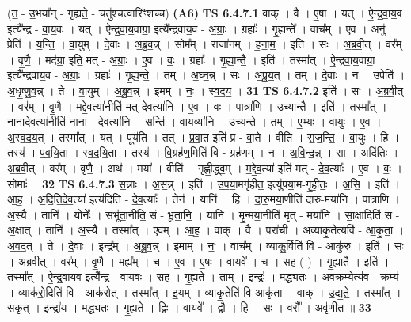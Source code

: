 \documentclass[17pt]{extarticle}
\begin{document}
                  \newline
                      (त॒ - उ॒भया᳚न् - गृह्यते॒ - चतु॑श्चत्वारिꣳशच्च)  \textbf{(A6)} \newline \newline
                                \textbf{ TS 6.4.7.1} \newline
                  वाक् । वै । ए॒षा । यत् । ऐ॒न्द्र॒वा॒य॒व इत्यै᳚न्द्र - वा॒य॒वः । यत् । ऐ॒न्द्र॒वा॒य॒वाग्रा॒ इत्यै᳚न्द्रवाय॒व - अ॒ग्राः॒ । ग्रहाः᳚ । गृ॒ह्यन्ते᳚ । वाच᳚म् । ए॒व । अनु॑ । प्रेति॑ । य॒न्ति॒ । वा॒युम् । दे॒वाः । अ॒ब्रु॒व॒न्न् । सोम᳚म् । राजा॑नम् । ह॒ना॒म॒ । इति॑ । सः । अ॒ब्र॒वी॒त् । वर᳚म् । वृ॒णै॒ । मद॑ग्रा॒ इति॒ मत् - अ॒ग्राः॒ । ए॒व । वः॒ । ग्रहाः᳚ । गृ॒ह्या॒न्तै॒ । इति॑ । तस्मा᳚त् । ऐ॒न्द्र॒वा॒य॒वाग्रा॒ इत्यै᳚न्द्रवाय॒व - अ॒ग्राः॒ । ग्रहाः᳚ । गृ॒ह्य॒न्ते॒ । तम् । अ॒घ्न॒न्न् । सः । अ॒पू॒य॒त् । तम् । दे॒वाः । न । उपेति॑ । अ॒धृ॒ष्णु॒व॒न्न् । ते । वा॒युम् । अ॒ब्रु॒व॒न्न् । इ॒मम् । नः॒ । स्व॒द॒य॒ । \textbf{  31} \newline
                  \newline
                                \textbf{ TS 6.4.7.2} \newline
                  इति॑ । सः । अ॒ब्र॒वी॒त् । वर᳚म् । वृ॒णै॒ । म॒द्दे॒व॒त्या॑नीति॑ मत्-दे॒व॒त्या॑नि । ए॒व । वः॒ । पात्रा॑णि । उ॒च्या॒न्तै॒ । इति॑ । तस्मा᳚त् । ना॒ना॒दे॒व॒त्या॑नीति॑ नाना - दे॒व॒त्या॑नि । सन्ति॑ । वा॒य॒व्या॑नि । उ॒च्य॒न्ते॒ । तम् । ए॒भ्यः॒ । वा॒युः । ए॒व । अ॒स्व॒द॒य॒त् । तस्मा᳚त् । यत् । पूय॑ति । तत् । प्र॒वा॒त इति॑ प्र - वा॒ते । वीति॑ । स॒ज॒न्ति॒ । वा॒युः । हि । तस्य॑ । प॒व॒यि॒ता । स्व॒द॒यि॒ता । तस्य॑ । वि॒ग्रह॑ण॒मिति॑ वि - ग्रह॑णम् । न । अ॒वि॒न्द॒न्न् । सा । अदि॑तिः । अ॒ब्र॒वी॒त् । वर᳚म् । वृ॒णै॒ । अथ॑ । मया᳚ । वीति॑ । गृ॒ह्णी॒द्ध्व॒म् । म॒द्दे॒व॒त्या॑ इति॑ मत् - दे॒व॒त्याः᳚ । ए॒व । वः॒ । सोमाः᳚ । \textbf{  32} \newline
                  \newline
                                \textbf{ TS 6.4.7.3} \newline
                  स॒न्नाः । अ॒स॒न्न् । इति॑ । उ॒प॒या॒मगृ॑हीत॒ इत्यु॑पया॒म-गृ॒ही॒तः॒ । अ॒सि॒ । इति॑ । आ॒ह॒ । अ॒दि॒ति॒दे॒व॒त्या॑ इत्य॑दिति - दे॒व॒त्याः᳚ । तेन॑ । यानि॑ । हि । दा॒रु॒मया॒णीति॑ दारु-मया॑नि । पात्रा॑णि । अ॒स्यै । तानि॑ । योनेः᳚ । संभू॑ता॒नीति॒ सं - भू॒ता॒नि॒ । यानि॑ । मृ॒न्मया॒नीति॑ मृत् - मया॑नि । सा॒क्षादिति॑ स - अ॒क्षात् । तानि॑ । अ॒स्यै । तस्मा᳚त् । ए॒वम् । आ॒ह॒ । वाक् । वै । परा॑ची । अव्या॑कृ॒तेत्यवि॑ - आ॒कृ॒ता॒ । अ॒व॒द॒त् । ते । दे॒वाः । इन्द्र᳚म् । अ॒ब्रु॒व॒न्न् । इ॒माम् । नः॒ । वाच᳚म् । व्याकु॒र्विति॑ वि - आकु॑रु । इति॑ । सः । अ॒ब्र॒वी॒त् । वर᳚म् । वृ॒णै॒ । मह्य᳚म् । च॒ । ए॒व । ए॒षः । वा॒यवे᳚ । च॒ । स॒ह ( ) । गृ॒ह्या॒तै॒ । इति॑ । तस्मा᳚त् । ऐ॒न्द्र॒वा॒य॒व इत्यै᳚न्द्र - वा॒य॒वः । स॒ह । गृ॒ह्य॒ते॒ । ताम् । इन्द्रः॑ । म॒द्ध्य॒तः । अ॒व॒क्रम्येत्य॑व - क्रम्य॑ । व्याक॑रो॒दिति॑ वि - आक॑रोत् । तस्मा᳚त् । इ॒यम् । व्याकृ॒तेति॑ वि-आकृ॑ता । वाक् । उ॒द्य॒ते॒ । तस्मा᳚त् । स॒कृत् । इन्द्रा॑य । म॒द्ध्य॒तः । गृ॒ह्य॒ते॒ । द्विः । वा॒यवे᳚ । द्वौ । हि । सः । वरौ᳚ । अवृ॑णीत ॥ \textbf{  33} \newline
\end{document}

